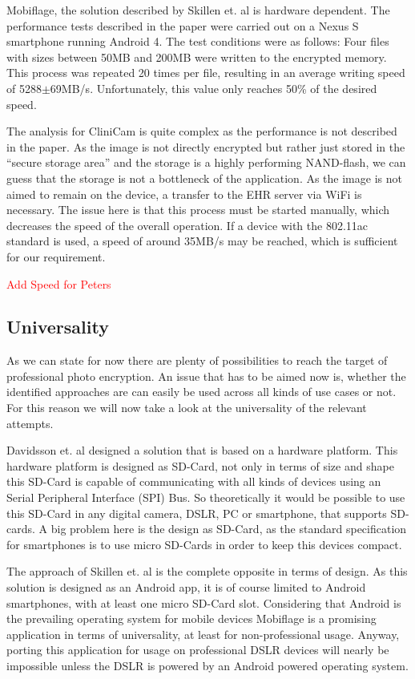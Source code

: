 \documentclass[12pt,a4paper,titlepage,oneside]{scrartcl}
\newcommand\todo[1]{\textcolor{red}{#1}}
\begin{document}
Mobiflage, the solution described by Skillen et. al \cite{skillen2013implementing} is hardware dependent.
The performance tests described in the paper were carried out on a Nexus S smartphone running Android 4.
The test conditions were as follows: 
Four files with sizes between 50MB and 200MB were written to the encrypted memory.
This process was repeated 20 times per file, resulting in an average writing speed of 5288$\pm$69MB/s.
Unfortunately, this value only reaches 50\% of the desired speed.

The analysis for CliniCam \cite{pmid25565678} is quite complex as the performance is not described in the paper.
As the image is not directly encrypted but rather just stored in the ``secure storage area'' and the storage is a highly performing NAND-flash, we can guess that the storage is not a bottleneck of the application.
As the image is not aimed to remain on the device, a transfer to the EHR server via WiFi is necessary.
The issue here is that this process must be started manually, which decreases the speed of the overall operation.
If a device with the 802.11ac standard is used, a speed of around 35MB/s may be reached, which is sufficient for our requirement.

\todo{Add Speed for Peters}

\subsection{Universality}
As we can state for now there are plenty of possibilities to reach the target of professional photo encryption.
An issue that has to be aimed now is, whether the identified approaches are can easily be used across all kinds of use cases or not.
For this reason we will now take a look at the universality of the relevant attempts.

Davidsson et. al \cite{Davidsson2016} designed a solution that is based on a hardware platform.
This hardware platform is designed as SD-Card, not only in terms of size and shape this SD-Card is capable of communicating with all kinds of devices using an Serial Peripheral Interface (SPI) Bus.
So theoretically it would be possible to use this SD-Card in any digital camera, DSLR, PC or smartphone, that supports SD-cards.
A big problem here is the design as SD-Card, as the standard specification for smartphones is to use micro SD-Cards in order to keep this devices compact.

The approach of Skillen et. al \cite{skillen2013implementing} is the complete opposite in terms of design.
As this solution is designed as an Android app, it is of course limited to Android smartphones, with at least one micro SD-Card slot.
Considering that Android is the prevailing operating system for mobile devices Mobiflage is a promising application in terms of universality, at least for non-professional usage.
Anyway, porting this application for usage on professional DSLR devices will nearly be impossible unless the DSLR is powered by an Android powered operating system.
\end{document}
